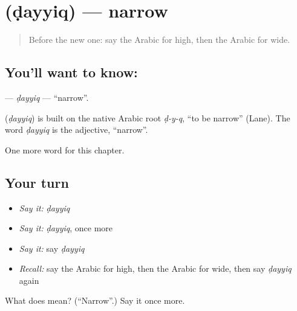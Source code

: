 \section[\texorpdfstring{\ar{ضيق} (ḍayyiq)}{ضيق (ḍayyiq)}]{ (ḍayyiq) — narrow}

\label{lesson:AR-C150-dayyiq}



\begin{quote}
Before the new one: say the Arabic for high, then the Arabic for wide.
\end{quote}

\subsection*{You'll want to know: }
\textbf{} — \emph{ḍayyiq} — \textquotedblleft{}narrow\textquotedblright{}.

\begin{cousinweb}
\textbf{} (\emph{ḍayyiq}) is built on the native Arabic root \emph{ḍ-y-q}, \textquotedblleft{}to be narrow\textquotedblright{} (Lane). The word \emph{ḍayyiq} is the adjective, \textquotedblleft{}narrow\textquotedblright{}.
\end{cousinweb}

\begin{grammarlens}[title={What you've built}]
One more word for this chapter.
\end{grammarlens}

\subsection*{Your turn}
\begin{itemize}
\raggedright
  \item \emph{Say it:} \emph{ḍayyiq}
  \item \emph{Say it:} \emph{ḍayyiq}, once more
  \item \emph{Say it:} say \emph{ḍayyiq}
  \item \emph{Recall:} say the Arabic for high, then the Arabic for wide, then say \emph{ḍayyiq} again
\end{itemize}

\begin{tcolorbox}[breakable,colback=teal!4,colframe=teal!35!black,title={Before you move on}]
What does  mean? (\textquotedblleft{}Narrow\textquotedblright{}.) Say it once more.
\end{tcolorbox}
